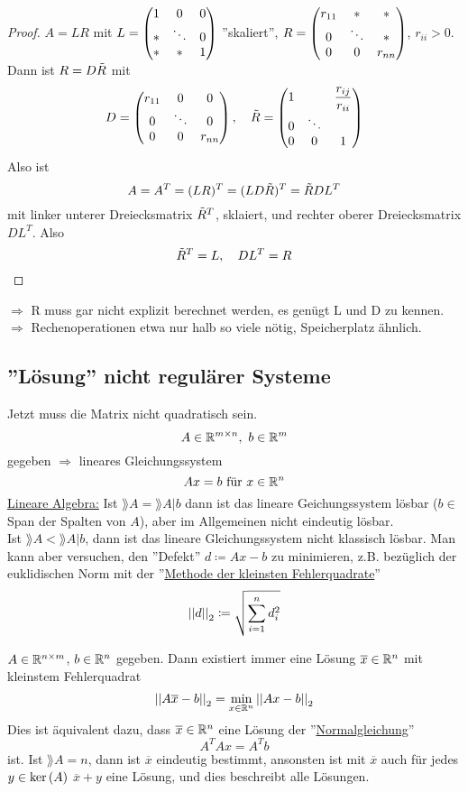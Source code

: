 \documentclass[../Skript.tex]{subfiles}
\begin{document}
\begin{proof}
    \(A = LR\) mit \(L = \begin{pmatrix}1& 0 & 0\\
    * & \ddots & 0\\
    * & * & 1\end{pmatrix}\) ''skaliert'', \(R = \begin{pmatrix}r_{11} & * & * \\
    0 & \ddots & *\\ 0 & 0 & r_{nn}\end{pmatrix}\), $r_{ii} > 0$. Dann ist 
    $R=D\Tilde{R}$ mit \[
        D = \begin{pmatrix}r_{11} & 0 & 0\\
                    0 & \ddots & 0 \\
                    0 & 0 & r_{nn}\end{pmatrix}, \hspace{1em} \Tilde{R} = \begin{pmatrix}1 & 
                    &\dfrac{r_{ij}}{r_{ii}}\\0&\ddots & \\0 & 0 & 1\end{pmatrix}
    \]
    Also ist \[
    A = A^T = (LR)^T = (LD\Tilde{R})^T = \Tilde{R}DL^T
    \]
    mit linker unterer Dreiecksmatrix $\Tilde{R}^T$, sklaiert, und rechter
    oberer Dreiecksmatrix $DL^T$. Also \[
        \Tilde{R}^T = L, \hspace{1em} DL^T = R
    \]
\end{proof}

    \(\Rightarrow\) R muss gar nicht explizit berechnet werden, es genügt 
    L und D zu kennen.\\
    \(\Rightarrow\) Rechenoperationen etwa nur halb so viele nötig, 
    Speicherplatz ähnlich.
\subsection{''Lösung'' nicht regulärer Systeme}
Jetzt muss die Matrix nicht quadratisch sein.
\[
A\in \mathbb{R}^{m\times n},\ b\in\mathbb{R}^m
\]
gegeben \(\Rightarrow\) lineares Gleichungssystem 
\[
Ax=b \text{ für } x\in\mathbb{R}^n
\]
\underline{Lineare Algebra:} Ist \(\rang A= \rang{A\vert b}\) dann ist das 
lineare Geichungssystem lösbar (\(b\in\)Span der Spalten von \(A\)), aber 
im Allgemeinen nicht eindeutig lösbar.\\
Ist \(\rang A<\rang{A\vert b}\), dann ist das lineare Gleichungssystem 
nicht klassisch lösbar.
Man kann aber versuchen, den ''Defekt'' $d\coloneqq Ax-b$ zu minimieren, 
z.B. bezüglich der euklidischen Norm mit der ''\underline{Methode der 
kleinsten Fehlerquadrate}'' \[
    \left\vert\left\vert d\right\vert\right\vert_2 \coloneqq \sqrt{\sum_{i=1}^n d_i^2}
\]
\begin{theorem}
    $A\in \Rnm n m$, $b \in \Rn n$ gegeben. Dann existiert immer eine 
    Lösung $\overline{x}\in \Rn n$ mit kleinstem Fehlerquadrat \[
        \left\vert\left\vert A\overline{x} -b\right\vert\right\vert_2 = \min_{x\in\mathbb{R}^n}\left\vert\left\vert Ax-b\right\vert\right\vert_2
    \] 
    Dies ist äquivalent dazu, dass $\overline{x}\in \mathbb{R}^n$ eine Lösung der 
    ''\underline{Normalgleichung}'' \[
        A^T A x = A^T b
    \] ist. Ist $\rang{A} = n$, dann ist $\overline{x}$ eindeutig 
    bestimmt, ansonsten ist mit $\overline{x}$ auch für jedes $y\in 
    \operatorname{ker}\left(A\right)$ $\overline{x}+y$ eine Lösung, und dies beschreibt alle 
    Lösungen. 
\end{theorem}
\end{document}

